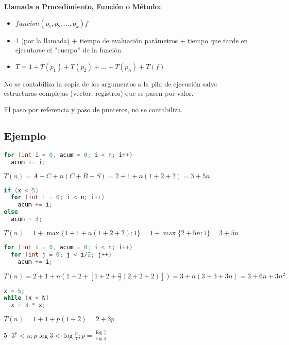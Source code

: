\textbf{Llamada a Procedimiento, Función o Método:}
\begin{itemize}
  \item $funcion(p_1, p_2, \dots, p_k) f$
  \item 1 (por la llamada) + tiempo de evaluación parámetros + tiempo que tarde en ejecutarse el ''cuerpo'' de la función.
  \item $T = 1 + T(p_1) + T(p_2) + \dots + T(p_n) + T(f)$
\end{itemize}

No se contabiliza la copia de los argumentos a la pila de ejecución salvo estructuras complejas (vector, registros) que se pasen por valor.

El paso por referencia y paso de punteros, no se contabiliza.

\subsection{Ejemplo}\label{subsec:ejemplo}
\begin{lstlisting}[language=Java,label={lst:lstlisting}]
for (int i = 0, acum = 0; i < n; i++)
  acum += i;
\end{lstlisting}

$T(n) = A + C + n ( C + B + S ) = 2 + 1 + n ( 1 + 2 + 2 ) = 3 + 5 n$

\begin{lstlisting}[language=Java,label={lst:lstlisting2}]
if (x < 5)
  for (int i = 0; i < n; i++)
    acum += i;
else
  acum = 3;
\end{lstlisting}

$T(n) = 1 + \max \{ 1 + 1 + n(1+2+2) ; 1 \} = 1 + \max \{ 2 + 5 n ; 1 \} = 3 + 5n$

\begin{lstlisting}[language=Java,label={lst:lstlisting3}]
for (int i = 0, acum = 0; i < n; i++)
  for (int j = 0; j < i/2; j++)
    acum += i;
\end{lstlisting}

$T(n) = 2 + 1 + n ( 1 + 2 + [ 1 + 2 + \frac{n}{2} ( 2 + 2 + 2) ]) = 3 + n (3 + 3 + 3 n) = 3 + 6 n + 3 n^2$

\begin{lstlisting}[language=Java,label={lst:lstlisting4}]
x = 5;
while (x < N)
  x = 3 * x;
\end{lstlisting}

$T(n) = 1 + 1 + p ( 1 + 2 ) = 2 + 3 p$

$5 \cdot 3^p < n; p \log 3 < \log \frac{n}{7}; p = \frac{\log \frac{n}{5}}{\log 3}$
\pagebreak


